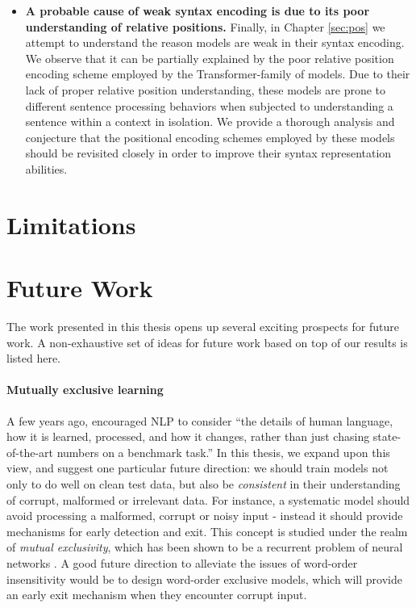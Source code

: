 \documentclass[letterpaper, 12pt]{report}
\begin{document}
\begin{itemize}
  \item \textbf{A probable cause of weak syntax encoding is due to its poor understanding of relative positions.} Finally, in Chapter \autoref{sec:pos} we attempt to understand the reason models are weak in their syntax encoding. We observe that it can be partially explained by the poor relative position encoding scheme employed by the Transformer-family of models. Due to their lack of proper relative position understanding, these models are prone to different sentence processing behaviors when subjected to understanding a sentence within a context in isolation. We provide a thorough analysis and conjecture that the positional encoding schemes employed by these models should be revisited closely in order to improve their syntax representation abilities.

\end{itemize}

\section{Limitations}
\label{sec:conc_limits}

\section{Future Work}
\label{sec:conc_future}

The work presented in this thesis opens up several exciting prospects for future work. A non-exhaustive set of ideas for future work based on top of our results is listed here.

\paragraph{Mutually exclusive learning} A few years ago, \cite{manning-etal-2015-computational} encouraged NLP to consider ``the details of human language, how it is learned, processed, and how it changes, rather than just chasing state-of-the-art numbers on a benchmark task.'' In this thesis, we expand upon this view, and suggest one particular future direction: we should train models not only to do well on clean test data, but also be \textit{consistent} in their understanding of corrupt, malformed or irrelevant data. For instance, a systematic model should avoid processing a malformed, corrupt or noisy input - instead it should provide mechanisms for early detection and exit. This concept is studied under the realm of \textit{mutual exclusivity}, which has been shown to be a recurrent problem of neural networks \citep{gandhi2019mutual}. A good future direction to alleviate the issues of word-order insensitivity would be to design word-order exclusive models, which will provide an early exit mechanism when they encounter corrupt input.
\end{document}

